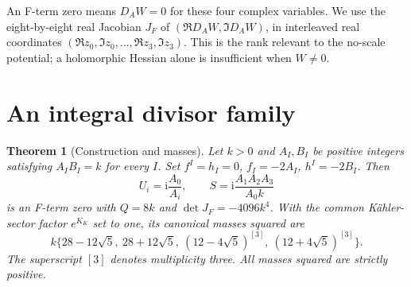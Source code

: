 \documentclass[11pt]{article}
\newtheorem{theorem}{Theorem}
\newcommand{\ii}{\mathrm{i}}
\begin{document}
An F-term zero means $D_AW=0$ for these four complex variables. We use the
eight-by-eight real Jacobian $J_F$ of $(\Re D_AW,\Im D_AW)$, in interleaved
real coordinates $(\Re z_0,\Im z_0,\ldots,\Re z_3,\Im z_3)$. This is the
rank relevant to the no-scale potential; a holomorphic Hessian alone is
insufficient when $W\ne0$.

\section{An integral divisor family}
\begin{theorem}[Construction and masses]\label{family}
Let $k>0$ and $A_I,B_I$ be positive integers satisfying $A_IB_I=k$ for every
$I$. Set $f^I=h_I=0$, $f_I=-2A_I$, $h^I=-2B_I$. Then
\begin{equation}
 U_i=\ii\frac{A_0}{A_i},\qquad
 S=\ii\frac{A_1A_2A_3}{A_0k}
 \label{divisorpoint}
\end{equation}
is an F-term zero with $Q=8k$ and $\det J_F=-4096k^4$. With the common
K\"ahler-sector factor $e^{K_K}$ set to one, its canonical masses squared are
\begin{equation}
k\{28-12\sqrt5,\ 28+12\sqrt5,\
 (12-4\sqrt5)^{[3]},\ (12+4\sqrt5)^{[3]}\}.
\label{spectrum}
\end{equation}
The superscript $[3]$ denotes multiplicity three. All masses squared are
strictly positive.
\end{theorem}
\end{document}
